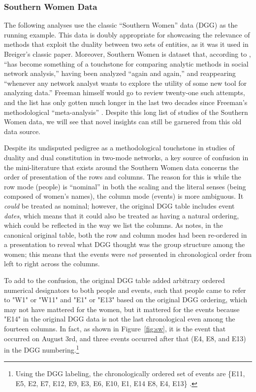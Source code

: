 \documentclass[a4paper,fleqn]{cas-sc}
\begin{document}
\subsubsection{Southern Women Data}
The following analyses use the classic ``Southern Women'' data \citep{davis1941} (DGG) as the running example. This data is doubly appropriate for showcasing the relevance of methods that exploit the duality between two sets of entities, as it was it used in Breiger's \citeyearpar{breiger1974duality} classic paper. Moreover, Southern Women is dataset that, according to \citet[p.]{freeman2003finding}, ``has become something of a touchstone for comparing analytic methods in social network analysis,'' having been analyzed ``again and again,'' and reappearing ``whenever any network analyst wants to explore the utility of some new tool for analyzing data.'' Freeman himself would go to review twenty-one such attempts, and the list has only gotten much longer in the last two decades since Freeman's methodological ``meta-analysis'' \citep[e.g.,][among many others]{doreian2004generalized, field2006identifying, roffilli2006identifying, wang2009exponential, kovacs2010generalized, brusco2011analysis, borgatti2014analyzing, everett2013dual, lerner2022dynamic, batagelj2022analysis, lizardo2024two}. Despite this long list of studies of the Southern Women data, we will see that novel insights can still be garnered from this old data source.

Despite its undisputed pedigree as a methodological touchstone in studies of duality and dual constitution in two-mode networks, a key source of confusion in the mini-literature that exists around the Southern Women data concerns the order of presentation of the rows and columns. The reason for this is while the row mode (people) is ``nominal'' in both the scaling and the literal senses (being composed of women's names), the column mode (events) is more ambiguous. It \textit{could} be treated as nominal; however, the original DGG table includes event \textit{dates}, which means that it could also be treated as having a natural ordering, which could be reflected in the way we list the columns.  As \citet{freeman2003finding} notes, in the canonical original table, both the row and column modes had been re-ordered in a presentation to reveal what DGG thought was the group structure among the women; this means that the events were \textit{not} presented in chronological order from left to right across the columns. 

To add to the confusion, the original DGG table added arbitrary ordered numerical designators to both people and events, such that people came to refer to "W1" or "W11" and "E1" or "E13" based on the original DGG ordering, which may not have mattered for the women, but it mattered for the events because "E14" in the original DGG data is not the last chronological even among the fourteen columns. In fact, as shown in Figure~\ref{fig:sw}, it is the event that occurred on August 3rd, and three events occurred after that (E4, E8, and E13) in the DGG numbering.\footnote{Using the DGG labeling, the chronologically ordered set of events are \{E11, E5, E2, E7, E12, E9, E3, E6, E10, E1, E14 E8, E4, E13\} \citep[p. 68]{everett2018measuring}.} 
\end{document}
